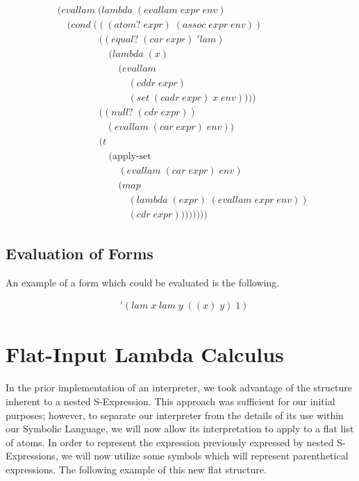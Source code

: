 \begin{align*}
& (evallam \; (lambda \; (evallam \; expr \; env)
\\& \quad (cond \; (((atom? \; expr) \; (assoc \; expr \; env))
\\& \qquad \qquad \; ((equal? \; (car \; expr) \; 'lam) \; 
\\& \qquad \qquad \quad \; (lambda \; (x) \; 
\\& \qquad \qquad \qquad \; (evallam \; 
\\& \qquad \qquad \qquad \quad \; (cddr \; expr) \; 
\\& \qquad \qquad \qquad \quad \; (set \; (cadr \; expr) \; x \; env))))
\\& \qquad \qquad \; ((null? \; (cdr \; expr)) \; 
\\& \qquad \qquad \quad (evallam \; (car \; expr) \; env))
\\& \qquad \qquad \; (t \; 
\\& \qquad \qquad \quad \; (\text{apply-set} \; 
\\& \qquad \qquad \qquad \; (evallam \; (car \; expr) \; env) \; 
\\& \qquad \qquad \qquad \; (map \; 
\\& \qquad \qquad \qquad \quad \; (lambda \; (expr) \; (evallam \; expr \; env)) \; 
\\& \qquad \qquad \qquad \quad \; (cdr \; expr))))))))
\end{align*}

\subsection{Evaluation of Forms}
An example of a form which could be evaluated is the following.

\begin{align*}
& '(lam \; x \; lam \; y \; ((x) \; y) \; 1)
\end{align*}

\section{Flat-Input Lambda Calculus}
In the prior implementation of an interpreter, we took advantage of the structure 
inherent to a nested S-Expression. This approach was sufficient for our initial 
purposes; however, to separate our interpreter from the details of its use within 
our Symbolic Language, we will now allow its interpretation to apply to a flat 
list of atoms.
In order to represent the expression previously expressed by nested S-Expressions, 
we will now utilize some symbols which will represent parenthetical expressions. 
The following example of this new flat structure.

